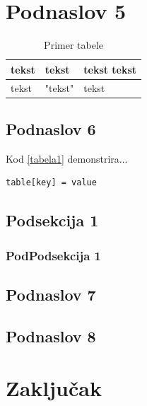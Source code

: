 \documentclass[a4paper]{article}
\begin{document}
\section{Podnaslov 5}
\label{sec:podnaslov5}



\begin{table}[h!]
\begin{center}
\caption{Primer tabele}
\begin{tabular}{|l|l|l|}
\hline
tekst & tekst & tekst tekst \\
\hline
tekst &  "tekst" &  tekst \\
\hline 
\end{tabular}
\label{tabela}
\end{center}
\end{table}

\subsection{Podnaslov 6}
\label{sec:podnaslov6}

Kod \ref{tabela1} demonstrira...

\begin{lstlisting}[caption={Primer koda},frame=single, label=tabela1]
table[key] = value
\end{lstlisting}


\subsection*{Podsekcija 1}


\subsubsection*{PodPodsekcija 1}


\subsection{Podnaslov 7}
\label{sec:podnaslov7}


\subsection{Podnaslov 8}
\label{sec:podnaslov8}


\section{Zaključak}
\label{sec:zakljucak}
\end{document}
